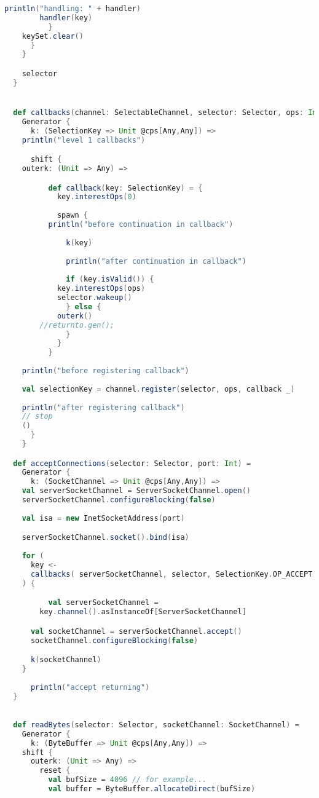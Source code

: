 \begin{lstlisting}[language=Scala]
    	    println("handling: " + handler)
  	    handler(key)
    	  }
  	keySet.clear()
      }
    }

    selector
  }


  def callbacks(channel: SelectableChannel, selector: Selector, ops: Int) =
    Generator {
      k: (SelectionKey => Unit @cps[Any,Any]) =>
	println("level 1 callbacks")

      shift {
	outerk: (Unit => Any) =>

    	  def callback(key: SelectionKey) = {	  
    	    key.interestOps(0)
	    
    	    spawn { 
  	      println("before continuation in callback")
  	      
    	      k(key)
    	      
    	      println("after continuation in callback")
    	      
    	      if (key.isValid()) {
    		key.interestOps(ops)
    		selector.wakeup()
    	      } else {
    		outerk()
		//returnto.gen();
    	      }
    	    }
    	  }
  	     
  	println("before registering callback")
  	  
	val selectionKey = channel.register(selector, ops, callback _)
  	
  	println("after registering callback")
  	// stop
  	()
      }
    }

  def acceptConnections(selector: Selector, port: Int) =
    Generator {
      k: (SocketChannel => Unit @cps[Any,Any]) =>       
  	val serverSocketChannel = ServerSocketChannel.open()      
	serverSocketChannel.configureBlocking(false)
	
  	val isa = new InetSocketAddress(port)

  	serverSocketChannel.socket().bind(isa)
	
	for (
	  key <-
	  callbacks( serverSocketChannel, selector, SelectionKey.OP_ACCEPT )
	) {

    	  val serverSocketChannel =
	    key.channel().asInstanceOf[ServerSocketChannel]

  	  val socketChannel = serverSocketChannel.accept()
  	  socketChannel.configureBlocking(false)

	  k(socketChannel)
	}
      
      println("accept returning")
  }

  
  def readBytes(selector: Selector, socketChannel: SocketChannel) =
    Generator {
      k: (ByteBuffer => Unit @cps[Any,Any]) =>
	shift {
	  outerk: (Unit => Any) =>
	    reset {
	      val bufSize = 4096 // for example...
  	      val buffer = ByteBuffer.allocateDirect(bufSize)


\end{lstlisting}

